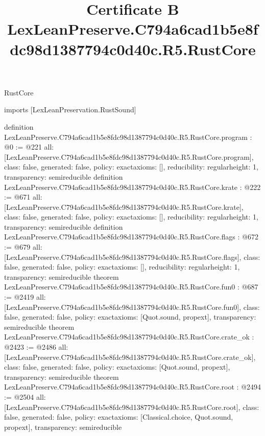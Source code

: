 \begin{lexlean}{RustCore}
\title{Certificate B LexLeanPreserve.C794a6cad1b5e8fdc98d1387794c0d40c.R5.RustCore}
\begin{coremodule}
imports [LexLeanPreservation.RustSound]

definition LexLeanPreserve.C794a6cad1b5e8fdc98d1387794c0d40c.R5.RustCore.program : @0 := @221 {
  all: [LexLeanPreserve.C794a6cad1b5e8fdc98d1387794c0d40c.R5.RustCore.program],
  class: false,
  generated: false,
  policy: exact{axioms: []},
  reducibility: regular{height: 1},
  transparency: semireducible
}
definition LexLeanPreserve.C794a6cad1b5e8fdc98d1387794c0d40c.R5.RustCore.krate : @222 := @671 {
  all: [LexLeanPreserve.C794a6cad1b5e8fdc98d1387794c0d40c.R5.RustCore.krate],
  class: false,
  generated: false,
  policy: exact{axioms: []},
  reducibility: regular{height: 1},
  transparency: semireducible
}
definition LexLeanPreserve.C794a6cad1b5e8fdc98d1387794c0d40c.R5.RustCore.flags : @672 := @679 {
  all: [LexLeanPreserve.C794a6cad1b5e8fdc98d1387794c0d40c.R5.RustCore.flags],
  class: false,
  generated: false,
  policy: exact{axioms: []},
  reducibility: regular{height: 1},
  transparency: semireducible
}
theorem LexLeanPreserve.C794a6cad1b5e8fdc98d1387794c0d40c.R5.RustCore.fun0 : @687 := @2419 {
  all: [LexLeanPreserve.C794a6cad1b5e8fdc98d1387794c0d40c.R5.RustCore.fun0],
  class: false,
  generated: false,
  policy: exact{axioms: [Quot.sound, propext]},
  transparency: semireducible
}
theorem LexLeanPreserve.C794a6cad1b5e8fdc98d1387794c0d40c.R5.RustCore.crate_ok : @2423 := @2486 {
  all: [LexLeanPreserve.C794a6cad1b5e8fdc98d1387794c0d40c.R5.RustCore.crate_ok],
  class: false,
  generated: false,
  policy: exact{axioms: [Quot.sound, propext]},
  transparency: semireducible
}
theorem LexLeanPreserve.C794a6cad1b5e8fdc98d1387794c0d40c.R5.RustCore.root : @2494 := @2504 {
  all: [LexLeanPreserve.C794a6cad1b5e8fdc98d1387794c0d40c.R5.RustCore.root],
  class: false,
  generated: false,
  policy: exact{axioms: [Classical.choice, Quot.sound, propext]},
  transparency: semireducible
}


\end{coremodule}
\end{lexlean}
